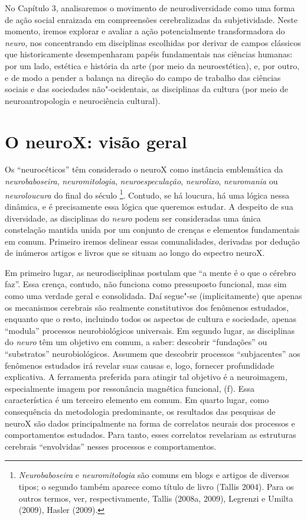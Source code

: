 No Capítulo 3, analisaremos o movimento de neurodiversidade como uma
forma de ação social enraizada em compreensões cerebralizadas da
subjetividade. Neste momento, iremos explorar e avaliar a ação
potencialmente transformadora do \emph{neuro}, nos concentrando em
disciplinas escolhidas por derivar de campos clássicos que
historicamente desempenharam papéis fundamentais nas ciências humanas:
por um lado, estética e história da arte (por meio da neuroestética), e,
por outro, e de modo a pender a balança na direção do campo de trabalho
das ciências sociais e das sociedades não"-ocidentais, as disciplinas da
cultura (por meio de neuroantropologia e neurociência cultural).

\chapter{O neuroX: visão geral}

Os ``neurocéticos'' têm considerado o neuroX como instância emblemática
da \emph{neurobaboseira}, \emph{neuromitologia},
\emph{neuroespeculação}, \emph{neurolixo}, \emph{neuromania} ou
\emph{neuroloucura} do final do século \footnote[2]{\emph{Neurobaboseira} e \emph{neuromitologia} são comuns em blogs e
artigos de diversos tipos; o segundo também aparece como título de livro
(Tallis 2004). Para os outros termos, ver, respectivamente, Tallis
(2008a, 2009), Legrenzi e Umilta (2009), Hasler (2009).}. Contudo,
se há loucura, há uma lógica nessa dinâmica, e é precisamente essa
lógica que queremos estudar. A despeito de sua diversidade, as
disciplinas do \emph{neuro} podem ser consideradas uma única constelação
mantida unida por um conjunto de crenças e elementos fundamentais em
comum. Primeiro iremos delinear essas comunalidades, derivadas por
dedução de inúmeros artigos e livros que se situam ao longo do espectro
neuroX.

Em primeiro lugar, as neurodisciplinas postulam que ``a mente é o que o
cérebro faz''. Essa crença, contudo, não funciona como pressuposto
funcional, mas sim como uma verdade geral e consolidada. Daí segue"-se
(implicitamente) que apenas os mecanismos cerebrais são realmente
constitutivos dos fenômenos estudados, enquanto que o resto, incluindo
todos os aspectos de cultura e sociedade, apenas ``modula'' processos
neurobiológicos universais. Em segundo lugar, as disciplinas do
\emph{neuro} têm um objetivo em comum, a saber: descobrir ``fundações''
ou ``substratos'' neurobiológicos. Assumem que descobrir processos
``subjacentes'' aos fenômenos estudados irá revelar suas causas e, logo,
fornecer profundidade explicativa. A ferramenta preferida para atingir
tal objetivo é a neuroimagem, especialmente imagem por ressonância
magnética funcional, (f). Essa característica é um terceiro elemento
em comum. Em quarto lugar, como consequência da metodologia
predominante, os resultados das pesquisas de neuroX são dados
principalmente na forma de correlatos neurais dos processos e
comportamentos estudados. Para tanto, esses correlatos revelariam as
estruturas cerebrais ``envolvidas'' nesses processos e comportamentos.

